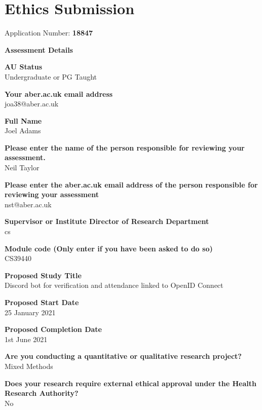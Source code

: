 \chapter{Ethics Submission}


Application Number: \textbf{18847}

\textbf{\huge Assessment Details}

\textbf{AU Status}\\
Undergraduate or PG Taught

\textbf{Your aber.ac.uk email address}\\
joa38@aber.ac.uk

\textbf{Full Name}\\
Joel Adams

\textbf{Please enter the name of the person responsible for reviewing your assessment.}\\
Neil Taylor

\textbf{Please enter the aber.ac.uk email address of the person responsible for reviewing your assessment}\\
nst@aber.ac.uk

\textbf{Supervisor or Institute Director of Research Department}\\
cs

\textbf{Module code (Only enter if you have been asked to do so)}\\
CS39440

\textbf{Proposed Study Title}\\
Discord bot for verification and attendance linked to OpenID Connect

\textbf{Proposed Start Date}\\
25 January 2021

\textbf{Proposed Completion Date}\\
1st June 2021

\textbf{Are you conducting a quantitative or qualitative research project?}\\
Mixed Methods

\textbf{Does your research require external ethical approval under the Health Research Authority?}\\
No

